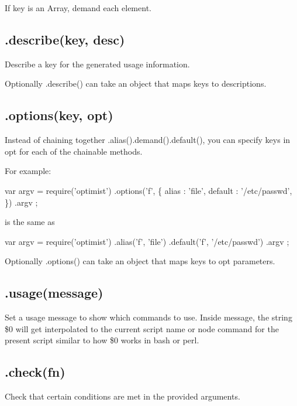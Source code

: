 If {\ttfamily key} is an Array, demand each element.

\subsection*{.describe(key, desc) }

Describe a {\ttfamily key} for the generated usage information.

Optionally {\ttfamily .describe()} can take an object that maps keys to descriptions.

\subsection*{.options(key, opt) }

Instead of chaining together {\ttfamily .alias().demand().default()}, you can specify keys in {\ttfamily opt} for each of the chainable methods.

For example\+:


\begin{DoxyCode}
var argv = require('optimist')
    .options('f', \{
        alias : 'file',
        default : '/etc/passwd',
    \})
    .argv
;
\end{DoxyCode}


is the same as


\begin{DoxyCode}
var argv = require('optimist')
    .alias('f', 'file')
    .default('f', '/etc/passwd')
    .argv
;
\end{DoxyCode}


Optionally {\ttfamily .options()} can take an object that maps keys to {\ttfamily opt} parameters.

\subsection*{.usage(message) }

Set a usage message to show which commands to use. Inside {\ttfamily message}, the string {\ttfamily \$0} will get interpolated to the current script name or node command for the present script similar to how {\ttfamily \$0} works in bash or perl.

\subsection*{.check(fn) }

Check that certain conditions are met in the provided arguments.

